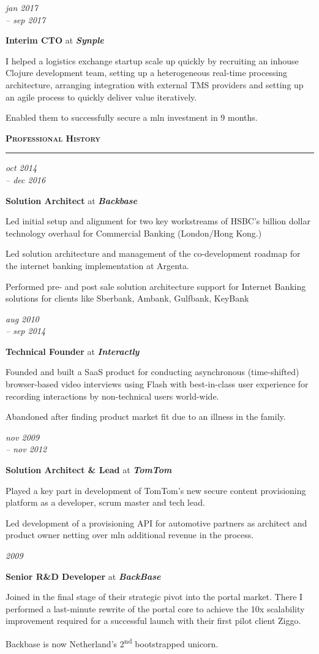 \documentclass[a4paper,11pt]{article}
\newlength{\sectionindent}
\newlength{\marginwidth}
\newlength{\sectionheaderindent}
\newcommand{\sectionheader}[1]{
    \vspace{1mm}
    \begin{minipage}[t]{\textwidth}
        \hspace{\sectionheaderindent}\textbf{\textsc{#1}}\\[-8pt\baselineskip] 
        \rule{\textwidth}{1pt}
    \end{minipage}\strut\vspace{3mm}}
\newcommand{\margin}[1]{
    \begin{minipage}[t]{\dimexpr\sectionindent-\marginwidth}
        \begin{flushright}
            \textit{#1}
        \end{flushright}
    \end{minipage}
    \hspace{\marginwidth}}
\newenvironment{descriptionsection}{
    \begingroup
    \setlength{\parskip}{4pt plus 2pt minus 1pt} 
}{
    \endgroup
}
\newcommand{\jobentry}[4]{
    \margin{#1}
    \begin{minipage}[t]{\dimexpr\textwidth-\sectionindent}
        \textbf{#2} at \textit{\textbf{#3}}\\[1pt]
        \begin{descriptionsection}
        #4
        \end{descriptionsection}
    \end{minipage}\vspace{4pt}}
\begin{document}
\jobentry{jan 2017\\-- sep 2017}{Interim CTO}{Synple}{
I helped a logistics exchange startup scale up quickly by recruiting an inhouse Clojure development team, setting up a heterogeneous real-time processing architecture, arranging integration with external TMS providers and setting up an agile process to quickly deliver value iteratively.

Enabled them to successfully secure a \EUR{1.1}mln investment in 9 months.}

\sectionheader{Professional History}
\jobentry{oct 2014\\-- dec 2016}{Solution Architect}{Backbase}{
Led initial setup and alignment for two key workstreams of HSBC’s billion dollar technology overhaul for Commercial Banking (London/Hong Kong.)

Led solution architecture and management of the co-development roadmap for the internet banking implementation at Argenta.

Performed pre- and post sale solution architecture support for Internet Banking solutions for clients like Sberbank, Ambank, Gulfbank, KeyBank}

\jobentry{aug 2010\\-- sep 2014}{Technical Founder}{Interactly}{
Founded and built a SaaS product for conducting asynchronous (time-shifted) browser-based video interviews using Flash with best-in-class user experience for recording interactions by non-technical users world-wide.

Abandoned after finding product market fit due to an illness in the family.}

\jobentry{nov 2009\\-- nov 2012}{Solution Architect \& Lead}{TomTom}{
Played a key part in development of TomTom's new secure content provisioning platform as a developer, scrum master and tech lead.

Led development of a provisioning API for automotive partners as architect and product owner netting over \EUR{1}mln additional revenue in the process.}

\jobentry{2009}{Senior R\&D Developer}{BackBase}{
Joined in the final stage of their strategic pivot into the portal market. There I performed a last-minute rewrite of the portal core to achieve the 10x scalability improvement required for a successful launch with their first pilot client Ziggo.

Backbase is now Netherland’s 2\textsuperscript{nd} bootstrapped unicorn.}
\end{document}
